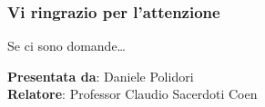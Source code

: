 \documentclass{beamer}
\begin{document}
\begin{frame}

 \frametitle{Vi ringrazio per l'attenzione}

 Se ci sono domande\ldots

 \vfill

 \begin{flushright}
  \textbf{Presentata da}: Daniele Polidori\\
  \textbf{Relatore}: Professor Claudio Sacerdoti Coen
 \end{flushright}

\end{frame}


\begin{frame}

 \frametitle{}


\end{frame}


\begin{frame}

 \frametitle{}


\end{frame}
\end{document}
